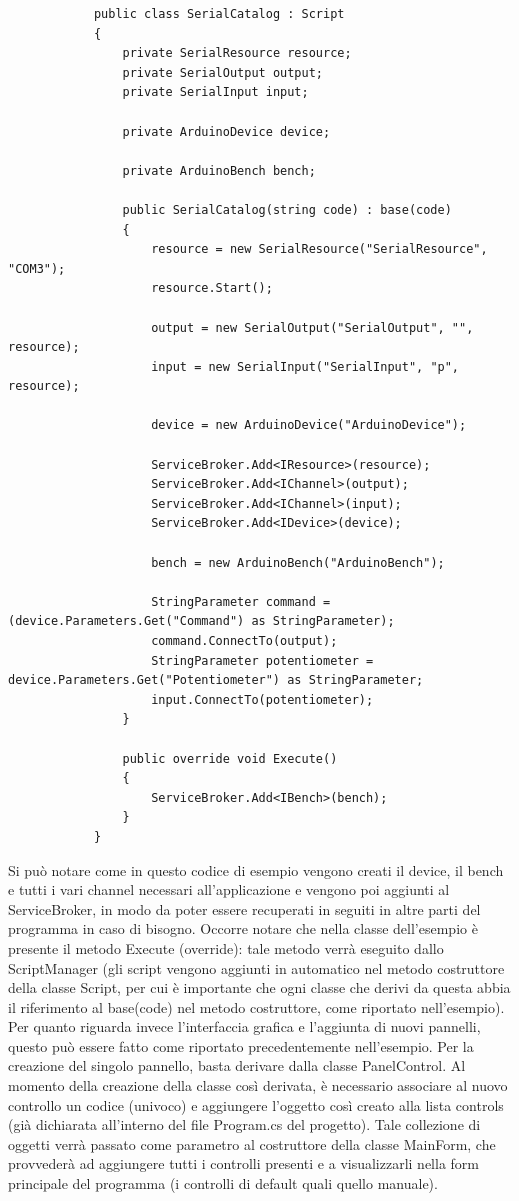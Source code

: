 \documentclass{article}
\begin{document}
		\begin{lstlisting}
			public class SerialCatalog : Script
			{
				private SerialResource resource;
				private SerialOutput output;
				private SerialInput input;
				
				private ArduinoDevice device;
				
				private ArduinoBench bench;
				
				public SerialCatalog(string code) : base(code)
				{
					resource = new SerialResource("SerialResource", "COM3");
					resource.Start();
					
					output = new SerialOutput("SerialOutput", "", resource);
					input = new SerialInput("SerialInput", "p", resource);
					
					device = new ArduinoDevice("ArduinoDevice");
					
					ServiceBroker.Add<IResource>(resource);
					ServiceBroker.Add<IChannel>(output);
					ServiceBroker.Add<IChannel>(input);
					ServiceBroker.Add<IDevice>(device);
					
					bench = new ArduinoBench("ArduinoBench");
					
					StringParameter command = (device.Parameters.Get("Command") as StringParameter);
					command.ConnectTo(output);
					StringParameter potentiometer = device.Parameters.Get("Potentiometer") as StringParameter;
					input.ConnectTo(potentiometer);
				}
				
				public override void Execute()
				{
					ServiceBroker.Add<IBench>(bench);
				}
			}
		\end{lstlisting}
		
		Si può notare come in questo codice di esempio vengono creati il device, il bench e tutti i vari channel necessari all'applicazione e vengono poi aggiunti al ServiceBroker, in modo da poter essere recuperati in seguiti in altre parti del programma in caso di bisogno. Occorre notare che nella classe dell'esempio è presente il metodo Execute (override): tale metodo verrà eseguito dallo ScriptManager (gli script vengono aggiunti in automatico nel metodo costruttore della classe Script, per cui è importante che ogni classe che derivi da questa abbia il riferimento al base(code) nel metodo costruttore, come riportato nell'esempio).
		\newline
		Per quanto riguarda invece l'interfaccia grafica e l'aggiunta di nuovi pannelli, questo può essere fatto come riportato precedentemente nell'esempio. Per la creazione del singolo pannello, basta derivare dalla classe PanelControl. Al momento della creazione della classe così derivata, è necessario associare al nuovo controllo un codice (univoco) e aggiungere l'oggetto così creato alla lista controls (già dichiarata all'interno del file Program.cs del progetto). Tale collezione di oggetti verrà passato come parametro al costruttore della classe MainForm, che provvederà ad aggiungere tutti i controlli presenti e a visualizzarli nella form principale del programma (i controlli di default quali quello manuale).
	\newpage
\end{document}
